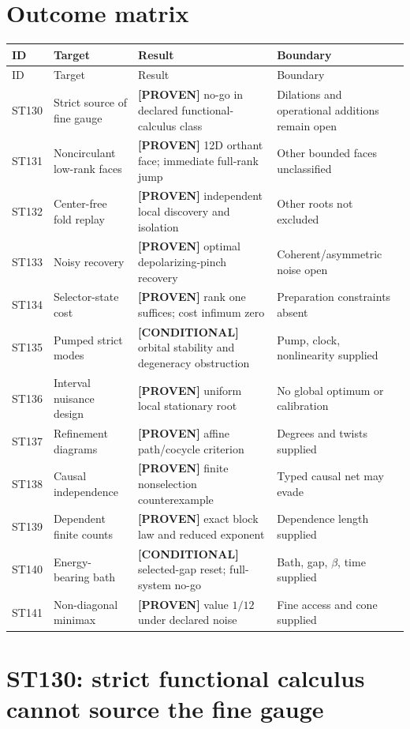 \documentclass[11pt,a4paper]{article}
\newcommand{\proven}{\textcolor{green!40!black}{\textbf{[PROVEN]}}}
\newcommand{\conditional}{\textcolor{violet!65!black}{\textbf{[CONDITIONAL]}}}
\begin{document}
\section{Outcome matrix}
\small
\begin{longtable}{@{}p{}p{}p{}p{}@{}}
\toprule ID & Target & Result & Boundary\\\midrule\endfirsthead
\toprule ID & Target & Result & Boundary\\\midrule\endhead
ST130 & Strict source of fine gauge & \proven{} no-go in declared functional-calculus class & Dilations and operational additions remain open\\
ST131 & Noncirculant low-rank faces & \proven{} 12D orthant face; immediate full-rank jump & Other bounded faces unclassified\\
ST132 & Center-free fold replay & \proven{} independent local discovery and isolation & Other roots not excluded\\
ST133 & Noisy recovery & \proven{} optimal depolarizing-pinch recovery & Coherent/asymmetric noise open\\
ST134 & Selector-state cost & \proven{} rank one suffices; cost infimum zero & Preparation constraints absent\\
ST135 & Pumped strict modes & \conditional{} orbital stability and degeneracy obstruction & Pump, clock, nonlinearity supplied\\
ST136 & Interval nuisance design & \proven{} uniform local stationary root & No global optimum or calibration\\
ST137 & Refinement diagrams & \proven{} affine path/cocycle criterion & Degrees and twists supplied\\
ST138 & Causal independence & \proven{} finite nonselection counterexample & Typed causal net may evade\\
ST139 & Dependent finite counts & \proven{} exact block law and reduced exponent & Dependence length supplied\\
ST140 & Energy-bearing bath & \conditional{} selected-gap reset; full-system no-go & Bath, gap, $\beta$, time supplied\\
ST141 & Non-diagonal minimax & \proven{} value $1/12$ under declared noise & Fine access and cone supplied\\
\bottomrule
\end{longtable}
\normalsize

\section{ST130: strict functional calculus cannot source the fine gauge}
\end{document}
